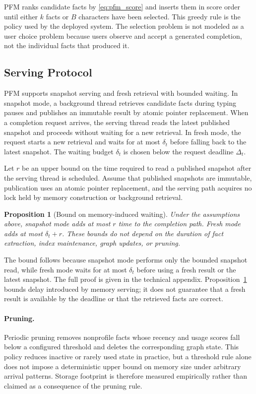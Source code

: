 \documentclass[letterpaper]{article} %
\newtheorem{proposition}{Proposition}
\begin{document}
PFM ranks candidate facts by \eqref{eq:pfm_score} and inserts them in score order until either $k$ facts or $B$ characters have been selected. This greedy rule is the policy used by the deployed system. The selection problem is not modeled as a user choice problem because users observe and accept a generated completion, not the individual facts that produced it.

\subsection{Serving Protocol}

PFM supports snapshot serving and fresh retrieval with bounded waiting. In snapshot mode, a background thread retrieves candidate facts during typing pauses and publishes an immutable result by atomic pointer replacement. When a completion request arrives, the serving thread reads the latest published snapshot and proceeds without waiting for a new retrieval. In fresh mode, the request starts a new retrieval and waits for at most $\delta_t$ before falling back to the latest snapshot. The waiting budget $\delta_t$ is chosen below the request deadline $\Delta_t$.

Let $r$ be an upper bound on the time required to read a published snapshot after the serving thread is scheduled. Assume that published snapshots are immutable, publication uses an atomic pointer replacement, and the serving path acquires no lock held by memory construction or background retrieval.

\begin{proposition}[Bound on memory-induced waiting]
\label{prop:waiting_bound}
Under the assumptions above, snapshot mode adds at most $r$ time to the completion path. Fresh mode adds at most $\delta_t+r$. These bounds do not depend on the duration of fact extraction, index maintenance, graph updates, or pruning.
\end{proposition}

The bound follows because snapshot mode performs only the bounded snapshot read, while fresh mode waits for at most $\delta_t$ before using a fresh result or the latest snapshot. The full proof is given in the technical appendix. Proposition~\ref{prop:waiting_bound} bounds delay introduced by memory serving; it does not guarantee that a fresh result is available by the deadline or that the retrieved facts are correct.

\paragraph{Pruning.} Periodic pruning removes nonprofile facts whose recency and usage scores fall below a configured threshold and deletes the corresponding graph state. This policy reduces inactive or rarely used state in practice, but a threshold rule alone does not impose a deterministic upper bound on memory size under arbitrary arrival patterns. Storage footprint is therefore measured empirically rather than claimed as a consequence of the pruning rule.
\end{document}
